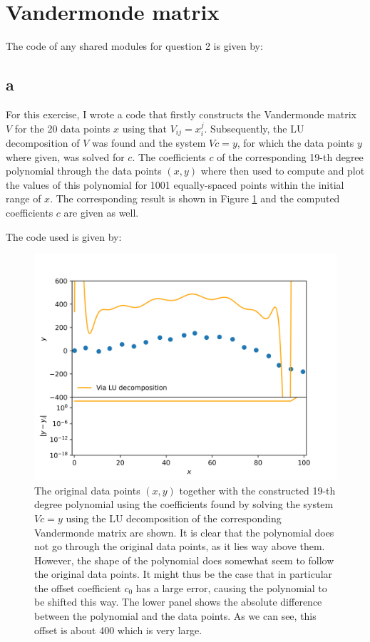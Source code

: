 \section{Vandermonde matrix}

The code of any shared modules for question 2 is given by:


\subsection{a}

For this exercise, I wrote a code that firstly constructs the Vandermonde matrix $V$ for the 20 data points $x$ using that $V_{ij}=x_i^j$.
Subsequently, the LU decomposition of $V$ was found and the system $Vc=y$, for which the data points $y$ where given, was solved for $c$.
The coefficients $c$ of the corresponding 19-th degree polynomial through the data points $(x,y)$ where then used to compute and plot the values
of this polynomial for 1001 equally-spaced points within the initial range of $x$.
The corresponding result is shown in Figure \ref{fig:2a} and the computed coefficients $c$ are given as well. 

The code used is given by:




\begin{figure}[h!]
    \centering
    \includegraphics[width=0.9\linewidth]{./my_vandermonde_sol_2a.png}
    \caption{The original data points $(x,y)$ together with the constructed 19-th degree polynomial
    using the coefficients found by solving the system $Vc=y$ using the LU decomposition of the corresponding Vandermonde matrix are shown.
    It is clear that the polynomial does not go through the original data points, as it lies way above them. However, the shape of the polynomial does somewhat seem to follow the original data points.
    It might thus be the case that in particular the offset coefficient $c_0$ has a large error, causing the polynomial to be shifted this way. The lower panel shows the absolute difference between
    the polynomial and the data points. As we can see, this offset is about 400 which is very large.}
    \label{fig:2a}
\end{figure}

